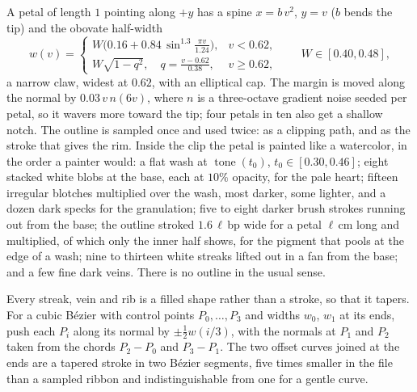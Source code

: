 \begin{construction}[Petal]
  A petal of length $1$ pointing along $+y$ has a spine $x=b\,v^2$,
  $y=v$ ($b$ bends the
  tip) and the obovate half-width
  \[
    w(v)=
    \begin{cases}
      W\bigl(0.16+0.84\,\sin^{1.3}\frac{\pi v}{1.24}\bigr), & v<0.62,\\[2pt]
      W\sqrt{1-q^2},\quad q=\frac{v-0.62}{0.38}, & v\ge 0.62,
    \end{cases}
    \qquad W\in[0.40,0.48],
  \]
  a narrow claw, widest at $0.62$, with an elliptical cap. The margin
  is moved along the
  normal by $0.03\,v\,n(6v)$, where $n$ is a three-octave gradient
  noise seeded per petal, so
  it wavers more toward the tip; four petals in ten also get a
  shallow notch. The outline is
  sampled once and used twice: as a clipping path, and as the stroke
  that gives the rim.
  Inside the clip the petal is painted like a watercolor, in the
  order a painter would: a
  flat wash at $\operatorname{tone}(t_0)$, $t_0\in[0.30,0.46]$; eight
  stacked white blobs at
  the base, each at $10\%$ opacity, for the pale heart; fifteen
  irregular blotches
  multiplied over the wash, most darker, some lighter, and a dozen
  dark specks for the
  granulation; five to eight darker brush strokes running out from
  the base; the outline
  stroked $1.6\,\ell\,$bp wide for a petal $\ell\,$cm long and
  multiplied, of which only the inner half shows, for the pigment
  that pools at the edge of a wash; nine to thirteen white streaks
  lifted out in a fan from
  the base; and a few fine dark veins. There is no outline in the usual sense.
\end{construction}

\begin{construction}
  Every streak, vein and rib is a filled shape rather than a stroke,
  so that it tapers. For a
  cubic B\'ezier with control points $P_0,\dots,P_3$ and widths
  $w_0$, $w_1$ at its ends, push
  each $P_i$ along its normal by $\pm\frac12 w(i/3)$, with the
  normals at $P_1$ and $P_2$ taken
  from the chords $P_2-P_0$ and $P_3-P_1$. The two offset curves
  joined at the ends are a
  tapered stroke in two B\'ezier segments, five times smaller in the
  file than a sampled
  ribbon and indistinguishable from one for a gentle curve.
\end{construction}

